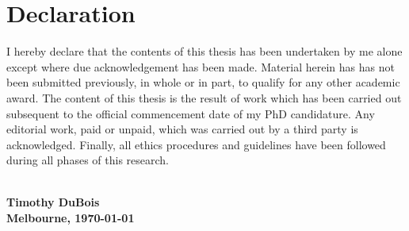 \chapter{Declaration}
\vspace{3cm}
I hereby declare that the contents of this thesis has been undertaken by me alone except where due acknowledgement has been made.
Material herein has has not been submitted previously, in whole or in part, to qualify for any other academic award.
The content of this thesis is the result of work which has been carried out subsequent to the official commencement date of my PhD candidature.
Any editorial work, paid or unpaid, which was carried out by a third party is acknowledged. Finally, all ethics procedures and guidelines have been followed during all phases of this research.

\vspace{4cm}
\parbox[b][2cm][t]{7cm}{\centering
    \dotfill\\
    {\textbf{Timothy DuBois}} \\
    \textbf{Melbourne, \today} 
}